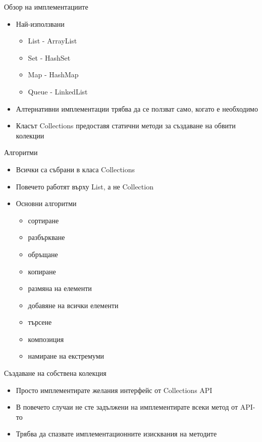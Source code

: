 \documentclass{beamer}
\begin{document}
\begin{frame}{Обзор на имплементациите}
  \transdissolve
  \begin{itemize}
  \item Най-използвани
    \begin{itemize}
      \item List - ArrayList
      \item Set - HashSet
      \item Map - HashMap
      \item Queue - LinkedList   
    \end{itemize}
    \item Алтернативни имплементации трябва да се ползват само, когато
      е необходимо
    \item Класът Collections предоставя статични методи за създаване
      на обвити колекции
  \end{itemize}
\end{frame}


\begin{frame}{Алгоритми}
  \transdissolve
  \begin{itemize}
  \item Всички са събрани в класа Collections
  \item Повечето работят върху List, а не Collection
  \item Основни алгоритми
    \begin{itemize}
      \item сортиране
      \item разбъркване
      \item обръщане
      \item копиране
      \item размяна на елементи
      \item добавяне на всички елементи
      \item търсене
      \item композиция
      \item намиране на екстремуми
    \end{itemize}

  \end{itemize}
\end{frame}

\begin{frame}{Създаване на собствена колекция}
  \transdissolve
  \begin{itemize}
  \item Просто имплементирате желания интерфейс от Collections API
  \item В повечето случаи не сте задължени на имплементирате всеки
    метод от API-то
  \item Трябва да спазвате имплементационните изисквания на методите
  \end{itemize}
\end{frame}
\end{document}
